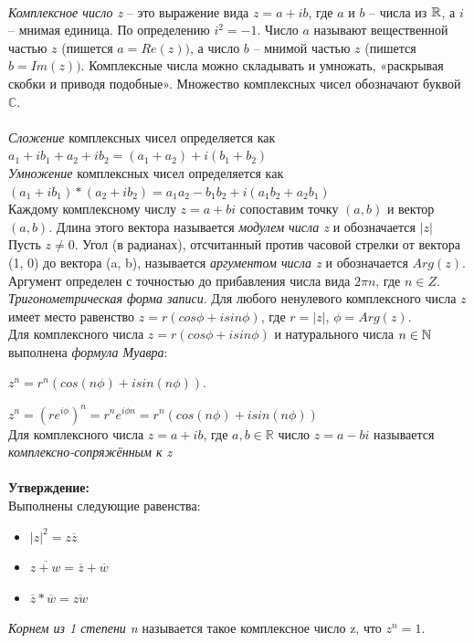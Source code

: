 \ \\
\Def \textit{Комплексное число z} -- это выражение вида $z = a+ib$, где $a$ и $b$ -- числа из $\mathbb{R}$, а $i$ -- мнимая единица. По определению
$i^2 = -1$. Число $a$ называют вещественной частью $z$ (пишется $a = Re (z))$, а число $b$ -- мнимой частью $z$ (пишется
$b = Im(z))$. Комплексные числа можно складывать и умножать, «раскрывая скобки и приводя подобные». Множество
комплексных чисел обозначают буквой $\mathbb{C}$.
\\
\\
\Def \textit{Сложение} комплексных чисел определяется как $a_1 + i b_1 + a_2 + i b_2 = (a_1 + a_2) + i(b_1 + b_2)$
\\
\Def \textit{Умножение} комплексных чисел определяется как $(a_1 + i b_1)*( a_2 + i b_2) = a_1a_2 - b_1b_2 + i(a_1b_2 + a_2b_1)$
\\
\Def
Каждому комплексному числу $z = a + bi$ сопоставим точку $(a, b)$ и вектор $(a, b)$. Длина этого вектора называется
\textit{модулем числа z} и обозначается $|z|$
\\
\Def Пусть $z \neq 0$.
Угол (в радианах), отсчитанный против часовой стрелки от вектора (1, 0) до вектора (a, b), называется \textit{аргументом числа z} и обозначается $Arg(z)$. Аргумент определен с точностью до прибавления
числа вида $2\pi n$, где $n \in Z$.
\\
\Def \textit{Тригонометрическая форма записи}. Для любого ненулевого комплексного числа $z$ имеет место равенство
$z = r(cos \phi + i sin \phi)$, где $r = |z|$, $\phi = Arg (z)$. \\
Для комплексного числа $z = r(cos \phi + i sin \phi)$ и натурального числа $n \in \mathbb{N}$ выполнена \textit{формула Муавра}: \begin{center}
    $z^n = r^n(cos( n  \phi) + i sin ( n \phi))$.
\end{center}
\Proof $z^n = (re^{i\phi})^n = r^n e^{i\phi n} = r^n(cos( n 
\phi) + i sin ( n \phi))$
\EndProof \\
\Def Для комплексного числа $z = a+ib$, где $a, b \in \mathbb{R}$ число $z = a - bi$ называется \textit{комплексно-сопряжённым к z}
\\
\\
\textbf{Утверждение:} \\
Выполнены следующие равенства:
\begin{itemize}
    \item[1] $|z|^2 = z\overline{z}$
    \item[2] $ \overline{z + w} = \overline{z} + \overline{w}$
     \item[3] $\overline{z} * \overline{w} = \overline{z w}$
\end{itemize}

\Def \textit{Корнем из 1 степени n} называется такое комплексное число z, что $z^n = 1$.